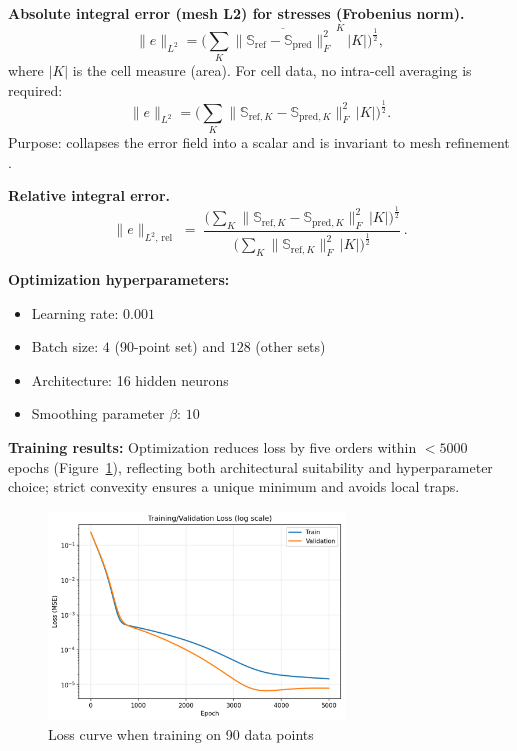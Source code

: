 \textbf{Absolute integral error (mesh L2) for stresses (Frobenius norm).}
\begin{equation}\label{eq:l2_abs_stress}
  \|e\|_{L^2} = \Bigg( \sum_{K} \overline{\| \mathbb S_{\text{ref}} - \mathbb S_{\text{pred}} \|_F^{2}}^{\,K}\, |K| \Bigg)^{\tfrac12},
\end{equation}
where $|K|$ is the cell measure (area). For cell data, no intra-cell averaging is required:
\begin{equation}\label{eq:l2_abs_stress_cell}
  \|e\|_{L^2} = \Bigg( \sum_{K} \| \mathbb S_{\text{ref},K} - \mathbb S_{\text{pred},K} \|_F^{2}\, |K| \Bigg)^{\tfrac12}.
\end{equation}
Purpose: collapses the error field into a scalar and is invariant to mesh refinement \cite{BrennerScott2008,AinsworthOden2000,Verfurth2013}.

\textbf{Relative integral error.}
\begin{equation}\label{eq:l2_rel_stress}
  \|e\|_{L^2,\,\mathrm{rel}}\;=\; \frac{\Big( \sum\limits_{K} 
  \| \mathbb S_{\mathrm{ref},K} - \mathbb S_{\mathrm{pred},K} \|_F^{2}\, |K| \Big)^{\tfrac12}}
  {\Big( \sum\limits_{K} \| \mathbb S_{\mathrm{ref},K} \|_F^{2}\, |K| \Big)^{\tfrac12}}\,.
\end{equation}


\textbf{Optimization hyperparameters:}
\begin{itemize}
  \item Learning rate: $0.001$
  \item Batch size: $4$ (90-point set) and $128$ (other sets)
  \item Architecture: 16 hidden neurons
  \item Smoothing parameter $\beta$: $10$
\end{itemize}

\textbf{Training results:}
Optimization reduces loss by five orders within $<5000$ epochs (Figure~\ref{fig:loss_curve}), reflecting both architectural suitability and hyperparameter choice; strict convexity ensures a unique minimum and avoids local traps.

\begin{figure}[H]
  \centering
\includegraphics[width=0.7\textwidth]{../img/loss_curve.png}
  \caption{Loss curve when training on 90 data points}
  \label{fig:loss_curve}
\end{figure}


